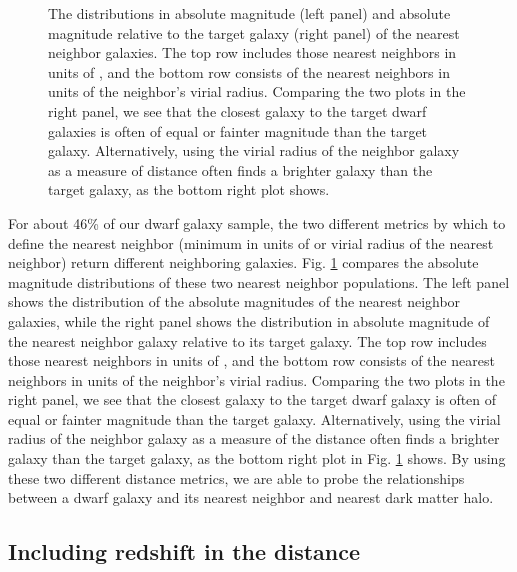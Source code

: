 \begin{figure}
    \caption[Distribution of absolute magnitudes of nearest neighbors]{The 
    distributions in absolute magnitude (left panel) and absolute magnitude 
    relative to the target galaxy (right panel) of the nearest neighbor 
    galaxies.  The top row includes those nearest neighbors in units of \hMpc, 
    and the bottom row consists of the nearest neighbors in units of the 
    neighbor's virial radius.  Comparing the two plots in the right panel, we 
    see that the closest galaxy to the target dwarf galaxies is often of equal 
    or fainter magnitude than the target galaxy.  Alternatively, using the 
    virial radius of the neighbor galaxy as a measure of distance often finds a 
    brighter galaxy than the target galaxy, as the bottom right plot shows.}
    \label{fig:Mr_dist}
\end{figure}

For about 46\% of our dwarf galaxy sample, the two different metrics by which to 
define the nearest neighbor (minimum in units of \hMpc or virial radius of the 
nearest neighbor) return different neighboring galaxies.  Fig. \ref{fig:Mr_dist} 
compares the absolute magnitude distributions of these two nearest neighbor 
populations.  The left panel shows the distribution of the absolute magnitudes 
of the nearest neighbor galaxies, while the right panel shows the distribution 
in absolute magnitude of the nearest neighbor galaxy relative to its target 
galaxy.  The top row includes those nearest neighbors in units of \hMpc, and the 
bottom row consists of the nearest neighbors in units of the neighbor's virial 
radius.  Comparing the two plots in the right panel, we see that the closest 
galaxy to the target dwarf galaxy is often of equal or fainter magnitude than 
the target galaxy.  Alternatively, using the virial radius of the neighbor 
galaxy as a measure of the distance often finds a brighter galaxy than the 
target galaxy, as the bottom right plot in Fig. \ref{fig:Mr_dist} shows.  By 
using these two different distance metrics, we are able to probe the 
relationships between a dwarf galaxy and its nearest neighbor and nearest dark 
matter halo.


\subsection{Including redshift in the distance}

